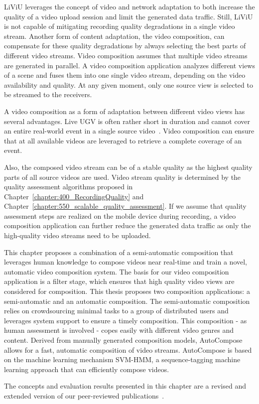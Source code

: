 \ac{LiViU} leverages the concept of video and network adaptation to both increase the quality of a video upload session and limit the generated data traffic.
Still, \ac{LiViU} is not capable of mitigating recording quality degradations in a single video stream.
Another form of content adaptation, the video composition, can compensate for these quality degradations by always selecting the best parts of different video streams.
Video composition assumes that multiple video streams are generated in parallel.
A video composition application analyzes different views of a scene and fuses them into one single video stream, depending on the video availability and quality. 
At any given moment, only one source view is selected to be streamed to the receivers. 

A video composition as a form of adaptation between different video views has several advantages.
Live \ac{UGV} is often rather short in duration and cannot cover an entire real-world event in a single source video~\cite{Stohr2015}. 
Video composition can ensure that at all available videos are leveraged to retrieve a complete coverage of an event.

Also, the composed video stream can be of a stable quality as the highest quality parts of all source videos are used.
Video stream quality is determined by the quality assessment algorithms proposed in Chapter~\ref{chapter:400_RecordingQuality} and Chapter~\ref{chapter:550_scalable_quality_assessment}.
If we assume that quality assessment steps are realized on the mobile device during recording, a video composition application can further reduce the generated data traffic as only the high-quality video streams need to be uploaded.

This chapter proposes a combination of a semi-automatic composition that leverages human knowledge to compose videos near real-time and train a novel, automatic video composition system.
The basis for our video composition application is a filter stage, which ensures that high quality video views are considered for composition.
This thesis proposes two composition applications: a semi-automatic and an automatic composition.
The semi-automatic composition relies on crowdsourcing minimal tasks to a group of distributed users and leverages system support to ensure a timely composition.
This composition - as human assessment is involved - copes easily with different video genres and content.
Derived from manually generated composition models, AutoCompose allows for a fast, automatic composition of video streams.
AutoCompose is based on the machine learning mechanism \ac{SVM-HMM}, a sequence-tagging machine learning approach that can efficiently compose videos.

The concepts and evaluation results presented in this chapter are a revised and extended version of our peer-reviewed publications~\cite{Wilk2014c,Wilk2015c,Wilk2015d}.
